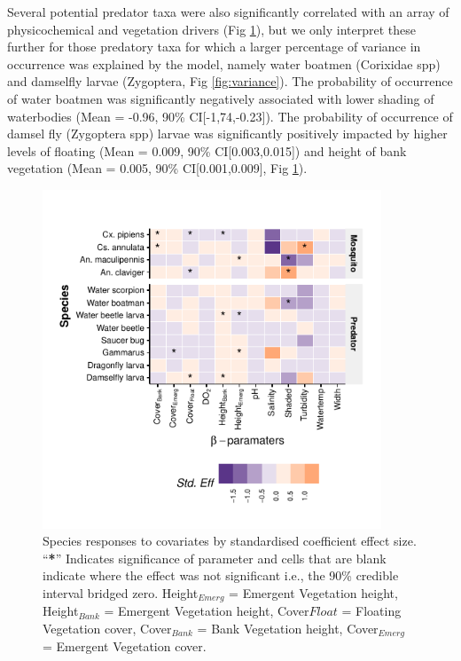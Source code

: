 \documentclass[lineno,sn-basic]{sn-jnl}%
\begin{document}
Several potential predator taxa were also significantly correlated with an array of physicochemical and vegetation drivers (Fig \ref{fig:environment}), but we only interpret these further for those predatory taxa for which a larger percentage of variance in occurrence was explained by the model, namely water boatmen (Corixidae spp) and damselfly larvae (Zygoptera, Fig \ref{fig:variance}). The probability of occurrence of water boatmen was significantly negatively associated with lower shading of waterbodies (Mean = -0.96, 90\% CI[-1,74,-0.23]). The probability of occurrence of damsel fly (Zygoptera spp) larvae was significantly positively impacted by higher levels of floating (Mean = 0.009, 90\% CI[0.003,0.015]) and height of bank vegetation (Mean = 0.005, 90\% CI[0.001,0.009], Fig \ref{fig:environment}).

\begin{figure}[h!htbp]
\centering
\includegraphics[width=0.9\textwidth]{beta_90.pdf}
\caption{Species responses to covariates by standardised coefficient effect size. “\textbf{*}” Indicates significance of parameter and cells that are blank indicate where the effect was not significant i.e., the 90\% credible interval bridged zero. Height$ _{Emerg} $ = Emergent Vegetation height, Height$ _{Bank} $ = Emergent Vegetation height, Cover$ Float $ = Floating Vegetation cover, Cover$ _{Bank} $ = Bank Vegetation height, Cover$ _{Emerg} $ = Emergent Vegetation cover.}\label{fig:environment}
\end{figure}
\end{document}
